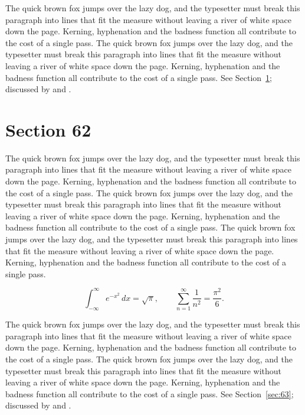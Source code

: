 \documentclass{article}
\begin{document}
The quick brown fox jumps over the lazy dog, and the typesetter must break this paragraph into lines that fit the measure without leaving a river of white space down the page. Kerning, hyphenation and the badness function all contribute to the cost of a single pass. The quick brown fox jumps over the lazy dog, and the typesetter must break this paragraph into lines that fit the measure without leaving a river of white space down the page. Kerning, hyphenation and the badness function all contribute to the cost of a single pass. 
See Section~\ref{sec:62}; discussed by \textcite{k2} and \textcite{l4}.
\section{Section 62}
\label{sec:62}
The quick brown fox jumps over the lazy dog, and the typesetter must break this paragraph into lines that fit the measure without leaving a river of white space down the page. Kerning, hyphenation and the badness function all contribute to the cost of a single pass. The quick brown fox jumps over the lazy dog, and the typesetter must break this paragraph into lines that fit the measure without leaving a river of white space down the page. Kerning, hyphenation and the badness function all contribute to the cost of a single pass. The quick brown fox jumps over the lazy dog, and the typesetter must break this paragraph into lines that fit the measure without leaving a river of white space down the page. Kerning, hyphenation and the badness function all contribute to the cost of a single pass. 

\begin{equation}\label{eq:62}
\int_{-\infty}^{\infty} e^{-x^{2}}\,dx = \sqrt{\pi}, \qquad
\sum_{n=1}^{\infty} \frac{1}{n^{2}} = \frac{\pi^{2}}{6}.
\end{equation}

The quick brown fox jumps over the lazy dog, and the typesetter must break this paragraph into lines that fit the measure without leaving a river of white space down the page. Kerning, hyphenation and the badness function all contribute to the cost of a single pass. The quick brown fox jumps over the lazy dog, and the typesetter must break this paragraph into lines that fit the measure without leaving a river of white space down the page. Kerning, hyphenation and the badness function all contribute to the cost of a single pass. 
See Section~\ref{sec:63}; discussed by \textcite{k3} and \textcite{l5}.
\end{document}
